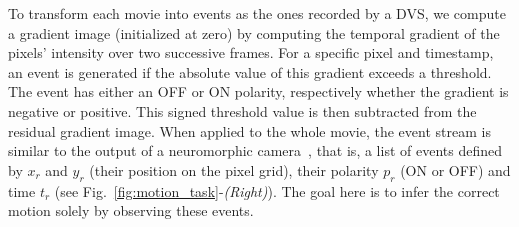 \documentclass[default]{sn-jnl}%
\theoremstyle{thmstyleone}%
\theoremstyle{thmstyletwo}%
\theoremstyle{thmstylethree}%
\newcommand{\seeFig}[1]{see Fig.~\ref{fig:#1}}%
\newcommand{\arank}{r} %
\newcommand{\timev}{t} %
\newcommand{\polev}{p} %
\newcommand{\note}[1]{{\sethlcolor{yellow}\hl{#1}}}
\begin{document}
To transform each movie into events as the ones recorded by a DVS, we compute a gradient image (initialized at zero) by computing the temporal gradient of the pixels' intensity over two successive frames. For a specific pixel and timestamp, an event is generated if the absolute value of this gradient exceeds a threshold. The event has either an OFF or ON polarity, respectively whether the gradient is negative or positive. This signed threshold value is then subtracted from the residual gradient image. When applied to the whole movie, the event stream is similar to the output of a neuromorphic camera~\citep{rasetto_challenges_2022}, that is, a list of events defined by $x_\arank$ and $y_\arank$ (their position on the pixel grid), their polarity $\polev_\arank$ (ON or OFF) and time $\timev_\arank$  (\seeFig{motion_task}-\textit{(Right)}). The goal here is to infer the correct motion solely by observing these events. 
\end{document}
